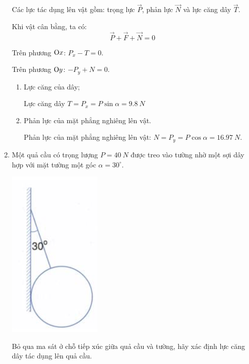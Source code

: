 \begin{enumerate}[label=\bfseries Câu \arabic*:]
	\loigiai
	{Các lực tác dụng lên vật gồm: trọng lực $\vec P$, phản lực $\vec N$ và lực căng dây $\vec T$.
		
	Khi vật cân bằng, ta có:
	$$\vec P + \vec F + \vec N = 0$$
	
	Trên phương $\text Ox$: $P_x - T = 0$.
	
	Trên phương $\text O y$: $-P_y + N = 0$.
	\begin{enumerate}
		\item Lực căng của dây;
		
	Lực căng dây $T=P_x = P \sin \alpha = \SI{9.8}{N}$
	
		\item Phản lực của mặt phẳng nghiêng lên vật.
		
	Phản lực của mặt phẳng nghiêng lên vật: $N=P_y = P \cos \alpha = \SI{16.97}{N}$.
	\end{enumerate}
	}
	\item {}
	
	\cauhoi
	{Một quả cầu có trọng lượng $P=\SI{40}{N}$ được treo vào tường nhờ một sợi dây hợp với mặt tường một góc $\alpha=30^{\circ}$. 
				\begin{center}
			\includegraphics[scale=0.8]{../figs/VN10-2021-PH-TP020-2.png}
		\end{center}
		Bỏ qua ma sát ở chỗ tiếp xúc giữa quả cầu và tường, hãy xác định lực căng dây tác dụng lên quả cầu. 
	}
	

\end{enumerate}
